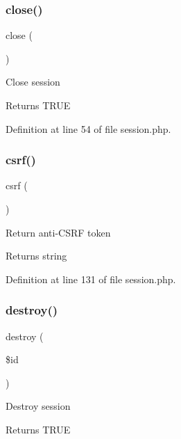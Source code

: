 \subsubsection{\texorpdfstring{close()}{close()}}
{\footnotesize\ttfamily close (\begin{DoxyParamCaption}{ }\end{DoxyParamCaption})}

Close session \begin{DoxyReturn}{Returns}
T\+R\+UE 
\end{DoxyReturn}


Definition at line 54 of file session.\+php.

\hypertarget{class_d_b_1_1_jig_1_1_session_a048d24aa22a28f92f1f3a7e3d323f45e}{}\label{class_d_b_1_1_jig_1_1_session_a048d24aa22a28f92f1f3a7e3d323f45e} 
\subsubsection{\texorpdfstring{csrf()}{csrf()}}
{\footnotesize\ttfamily csrf (\begin{DoxyParamCaption}{ }\end{DoxyParamCaption})}

Return anti-\/\+C\+S\+RF token \begin{DoxyReturn}{Returns}
string 
\end{DoxyReturn}


Definition at line 131 of file session.\+php.

\hypertarget{class_d_b_1_1_jig_1_1_session_a726fa8a4b4b187b9ca32ba427aac8137}{}\label{class_d_b_1_1_jig_1_1_session_a726fa8a4b4b187b9ca32ba427aac8137} 
\subsubsection{\texorpdfstring{destroy()}{destroy()}}
{\footnotesize\ttfamily destroy (\begin{DoxyParamCaption}\item[{}]{\$id }\end{DoxyParamCaption})}

Destroy session \begin{DoxyReturn}{Returns}
T\+R\+UE 
\end{DoxyReturn}

